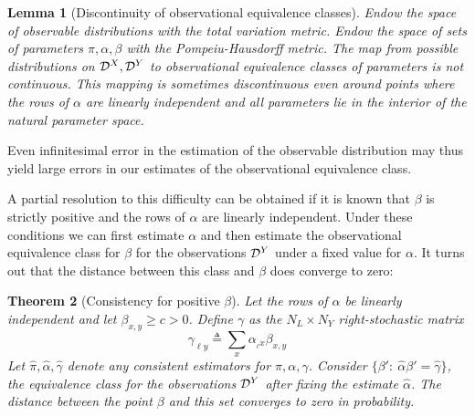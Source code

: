 \documentclass{article}
\newtheorem{thm}{Theorem}
\newtheorem{lemma}[thm]{Lemma}
\theoremstyle{definition}
\begin{document}
\begin{lemma}[Discontinuity of observational equivalence classes]  \label{lem:noobseq} Endow the space of observable distributions with the total variation metric.  Endow the space of sets of parameters $\pi,\alpha,\beta$ with the Pompeiu-Hausdorff metric.  The map from possible distributions on $\mathcal{D}^X,\mathcal{D}^Y$ to observational equivalence classes of parameters is not continuous.   This mapping is sometimes discontinuous even around points where the rows of $\alpha$ are linearly independent and all parameters lie in the interior of the natural parameter space.  
\end{lemma}

Even infinitesimal error in the estimation of the observable distribution may thus yield large errors in our estimates of the observational equivalence class.

A partial resolution to this difficulty can be obtained if it is known that $\beta$ is strictly positive and the rows of $\alpha$ are linearly independent.  Under these conditions we can first estimate $\alpha$ and then estimate the observational equivalence class for $\beta$ for the observations $\mathcal{D}^Y$ under a fixed value for $\alpha$.  It turns out that the distance between this class and $\beta$ does converge to zero:

\begin{thm}[Consistency for positive $\beta$] Let the rows of $\alpha$ be linearly independent and let $\beta_{x,y}\geq c>0$.  Define $\gamma$ as the $N_L\times N_Y$ right-stochastic matrix
\[
\gamma_{\ell y} \triangleq \sum_{x} \alpha_{_\ell x} \beta_{x,y}
\]
Let $\hat \pi, \hat \alpha, \hat \gamma$ denote any consistent estimators for $\pi,\alpha,\gamma$.  Consider $\{\beta':\ \hat \alpha\beta'=\hat \gamma \}$, the equivalence class for the observations $\mathcal{D}^Y$ after fixing the estimate $\hat \alpha$.  The distance between the point $\beta$ and this set converges to zero in probability.  
\end{thm}
\end{document}
